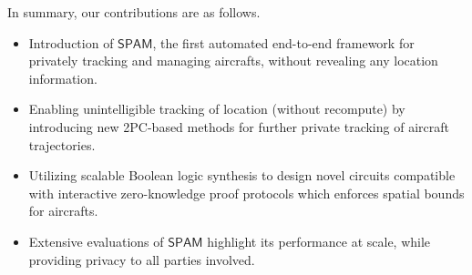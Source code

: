\documentclass[9pt,sigconf,screen]{acmart}
\newcommand{\nojan}[1]{\textcolor{red}{{\sf (NS:} {\sl{#1})}}}
\newcommand{\yaman}[1]{\textcolor{blue}{{\sf (YJ:} {\sl{#1})}}}
\newcommand\sys{$\mathsf{SPAM}$\xspace}
\begin{document}




In summary, our contributions are as follows.
\begin{itemize}
    \item Introduction of \sys, the first automated end-to-end framework for privately tracking and managing aircrafts, without revealing any location information.
    \item Enabling unintelligible tracking of location (without recompute) by introducing new 2PC-based methods for further private tracking of aircraft trajectories.
    \item Utilizing scalable Boolean logic synthesis to design novel circuits compatible with interactive zero-knowledge proof protocols which enforces spatial bounds for aircrafts.
    \item Extensive evaluations of \sys highlight its performance at scale, while providing privacy to all parties involved.
\end{itemize}
\end{document}
